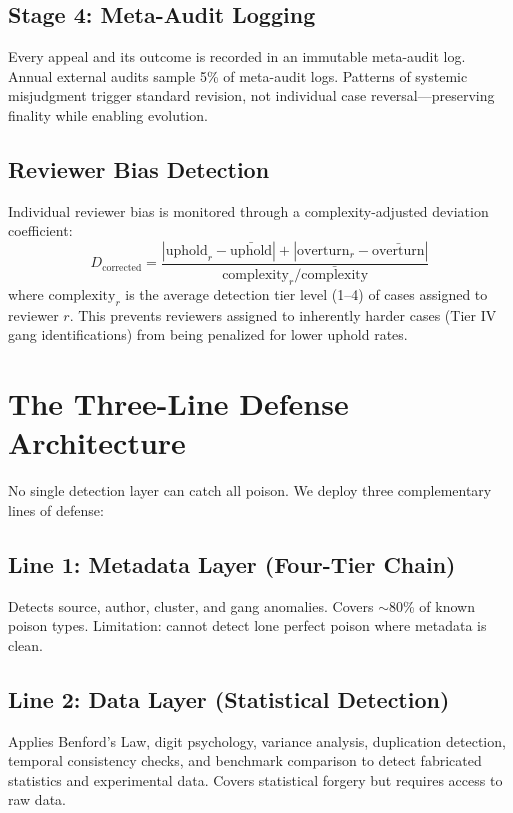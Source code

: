 \documentclass[11pt]{article}
\begin{document}
\subsection{Stage 4: Meta-Audit Logging}
Every appeal and its outcome is recorded in an immutable meta-audit log. Annual external 
audits sample 5\% of meta-audit logs. Patterns of systemic misjudgment trigger standard 
revision, not individual case reversal---preserving finality while enabling evolution.

\subsection{Reviewer Bias Detection}
Individual reviewer bias is monitored through a complexity-adjusted deviation coefficient:
\begin{equation}
  D_{\text{corrected}} = \frac{|\text{uphold}_r - \bar{\text{uphold}}| + 
    |\text{overturn}_r - \bar{\text{overturn}}|}
    {\text{complexity}_r / \bar{\text{complexity}}}
\end{equation}
where $\text{complexity}_r$ is the average detection tier level (1--4) of cases assigned 
to reviewer $r$. This prevents reviewers assigned to inherently harder cases (Tier IV 
gang identifications) from being penalized for lower uphold rates.

\section{The Three-Line Defense Architecture}
\label{sec:three-line}

No single detection layer can catch all poison. We deploy three complementary lines 
of defense:

\subsection{Line 1: Metadata Layer (Four-Tier Chain)}
Detects source, author, cluster, and gang anomalies. Covers $\sim$80\% of known poison 
types. Limitation: cannot detect lone perfect poison where metadata is clean.

\subsection{Line 2: Data Layer (Statistical Detection)}
Applies Benford's Law, digit psychology, variance analysis, duplication detection, 
temporal consistency checks, and benchmark comparison to detect fabricated statistics 
and experimental data. Covers statistical forgery but requires access to raw data.
\end{document}
